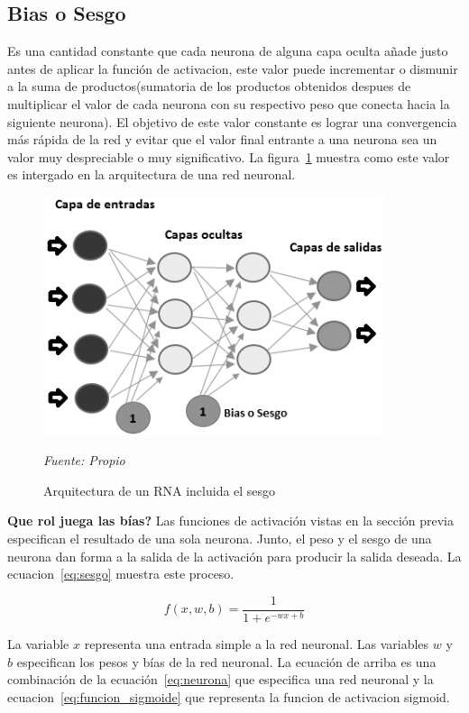 \subsection{Bias o Sesgo}
Es una cantidad constante que cada neurona de alguna capa oculta añade justo antes de aplicar la función de activacion, este valor puede incrementar o dismunir a la suma de productos(sumatoria de los productos obtenidos despues de multiplicar el valor de cada neurona con su respectivo peso que conecta hacia la siguiente neurona). El objetivo de este valor constante es lograr una convergencia más rápida de la red y evitar que el valor final entrante a una neurona sea un valor muy despreciable o muy significativo. La figura~\ref{fig:arquitectura_red_neuronal} muestra como este valor es intergado en la arquitectura de una red neuronal.

\begin{figure}[H]
		\centering
		\includegraphics[width=100mm]{Imagenes/arquitectura_red_neuronal.png}
		\caption{Arquitectura de un RNA incluida el sesgo}
		\vspace{0.15cm}
		\textit{Fuente: Propio}
		\label{fig:arquitectura_red_neuronal}
\end{figure}


\textbf{Que rol juega las bías?} Las funciones de activación vistas en la sección previa especifican el resultado de una sola neurona. Junto, el peso y el sesgo de una neurona dan forma a la salida de la activación para producir la salida deseada. La ecuacion~\ref{eq:sesgo} muestra este proceso.

\begin{equation}\label{eq:sesgo}
f(x, w, b) = \frac{1}{1 + e^{-wx+b}}
\end{equation}

La variable $x$ representa una entrada simple a la red neuronal. Las variables $w$ y $b$ especifican los pesos y bías de la red neuronal. La ecuación de arriba es una combinación de la ecuación~\ref{eq:neurona} que especifica una red neuronal y la ecuacion~\ref{eq:funcion_sigmoide} que representa la funcion de activacion sigmoid.


